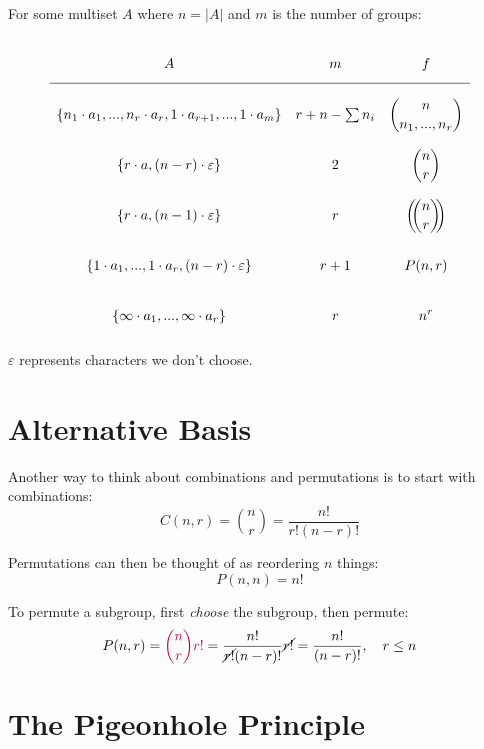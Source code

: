 \documentclass{article}
\begin{document}
    For some multiset $A$ where $n = |A|$ and $m$ is the number of groups: $$\def\arraystretch{3}
    \begin{array}{>{\displaystyle}cc>{\displaystyle}c}
        A & m & f \\
        \hline
        \{n_1 \cdot a_1, ..., n_r \cdot a_r, 1 \cdot a_{r + 1}, ..., 1 \cdot a_m\} & r + n - \sum{n_i} & {n \choose n_1, ..., n_r} \\
        \{r \cdot a, (n - r) \cdot \varepsilon\} & 2 & {n \choose r} \\
        \{r \cdot a, (n - 1) \cdot \varepsilon\} & r & \left(\!\!{n \choose r}\!\!\right) \\
        \{1 \cdot a_1, ..., 1 \cdot a_r, (n - r) \cdot \varepsilon\} & r + 1 & P(n, r) \\
        \{\infty \cdot a_1, ..., \infty \cdot a_r\} & r & n^r \\
    \end{array}$$

    $\varepsilon$ represents characters we don't choose.
    
    \section{Alternative Basis}

    Another way to think about combinations and permutations is to start with combinations: \begin{equation}
        C(n, r) = {n \choose r} = \frac{n!}{r!(n - r)!}
    \end{equation}

    Permutations can then be thought of as reordering $n$ things: \begin{equation}
        P(n, n) = n!
    \end{equation}
        
    To permute a subgroup, first \textit{choose} the subgroup, then permute: \begin{equation}
        P(n, r) = \color{purple}{n \choose r}r!\color{black} = \frac{n!}{\cancel{r!}(n - r)!}\cancel{r!} = \frac{n!}{(n - r)!}, \quad r \leq n
    \end{equation}

    \section{The Pigeonhole Principle}
\end{document}
